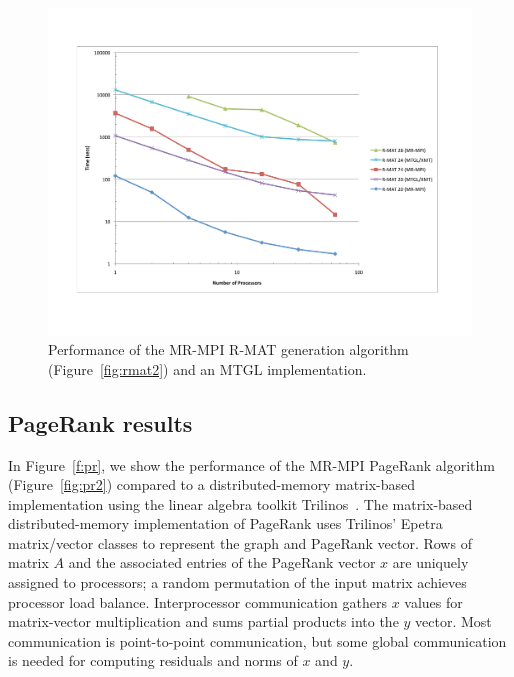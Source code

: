 \begin{figure}[htb]
\includegraphics[width=\textwidth]{fig_rmat.pdf}
\caption{Performance of the MR-MPI R-MAT generation algorithm (Figure~\ref{fig:rmat2}) and an MTGL implementation.}
\label{f:rmat}
\end{figure}

\subsection{PageRank results}
\label{subsec:results_pagerank}

In Figure~\ref{f:pr}, we show the performance of the MR-MPI PageRank algorithm
(Figure~\ref{fig:pr2}) compared to a
distributed-memory matrix-based implementation using the linear
algebra toolkit Trilinos~\cite{Trilinos-Overview}.
The matrix-based distributed-memory implementation of PageRank
uses Trilinos' Epetra matrix/vector classes to represent the graph and
PageRank vector.
Rows of matrix $A$ and the associated entries of the PageRank vector $x$
are uniquely assigned to processors; a random permutation of the input
matrix achieves processor load balance.
Interprocessor communication gathers $x$ values for matrix-vector
multiplication and sums partial products into the $y$ vector.
Most communication is point-to-point communication,
but some global communication is needed for computing
residuals and norms of $x$ and $y$.

